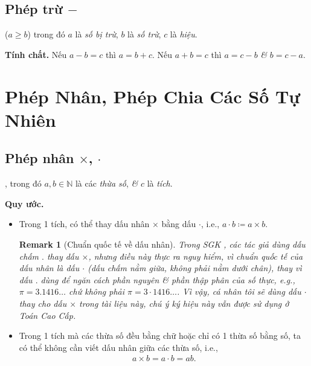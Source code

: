 \documentclass[oneside]{book}
\numberwithin{equation}{section}
\newtheorem{remark}{Remark}[section]
\begin{document}
\subsection{Phép trừ $-$}
 ($a\ge b$) trong đó $a$ là \textit{số bị trừ}, $b$ là \textit{số trừ}, $c$ là \textit{hiệu}.

\noindent\textbf{Tính chất.} Nếu $a - b = c$ thì $a = b + c$. Nếu $a + b = c$ thì $a = c - b$ \textit{\&} $b = c - a$.

\section{Phép Nhân, Phép Chia Các Số Tự Nhiên}

\subsection{Phép nhân $\times$, $\cdot$}
, trong đó $a,b\in\mathbb{N}$ là các \textit{thừa số}, \textit{\&} $c$ là \textit{tích}.

\noindent\textbf{Quy ước.}
\begin{itemize}
	\item Trong 1 tích, có thể thay dấu nhân $\times$ bằng dấu $\cdot$, i.e., $a\cdot b\coloneqq a\times b$.
	
	\begin{remark}[Chuẩn quốc tế về dấu nhân]
		Trong SGK \cite[p. 18]{Thai_Anh_Dat_Ha_Loan_Nam_Quang_Toan_6_tap_1}, các tác giả dùng dấu chấm $.$ thay dấu $\times$, nhưng điều này thực ra nguy hiểm, vì chuẩn quốc tế của dấu nhân là dấu $\cdot$ (dấu chấm nằm giữa, không phải nằm dưới chân), thay vì dấu $.$ dùng để ngăn cách phần nguyên \textit{\&} phần thập phân của số thực, e.g., $\pi = 3.1416\ldots$ chứ không phải $\pi = 3\cdot 1416\ldots$. Vì vậy, cá nhân tôi sẽ dùng dấu $\cdot$ thay cho dấu $\times$ trong tài liệu này, chú ý ký hiệu này vẫn được sử dụng ở Toán Cao Cấp.
	\end{remark}
	\item Trong 1 tích mà các thừa số đều bằng chữ hoặc chỉ có 1 thừa số bằng số, ta có thể không cần viết dấu nhân giữa các thừa số, i.e.,
	\begin{align*}
		a\times b = a\cdot b = ab.
	\end{align*}
\end{itemize}
\end{document}
